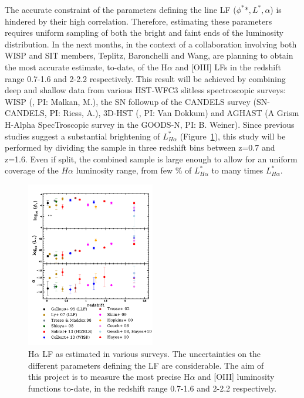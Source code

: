 The accurate constraint of the parameters defining the line LF ($\phi^{*}*, L^{*}, \alpha$) is hindered by their high correlation. Therefore, estimating these parameters requires uniform sampling of both the bright and faint ends of the luminosity distribution. In the next months, in the context of a collaboration involving both WISP and SIT members, Teplitz, Baronchelli and Wang, are planning to obtain the most accurate estimate, to-date, of the H$\alpha$ and [OIII] LFs in the redshift range 0.7-1.6 and 2-2.2 respectively. This result will be achieved by combining deep and shallow data from various HST-WFC3 slitless spectroscopic surveys: WISP (\citet{Atek:2010}, PI: Malkan, M.), the SN followup of the CANDELS survey (SN-CANDELS, PI: Riess, A.), 3D-HST (\citet{VanDokkum:2011,Brammer:2012}, PI: Van Dokkum) and AGHAST (A Grism H-Alpha SpecTroscopic survey in the GOODS-N, PI: B. Weiner).
Since previous studies suggest a substantial brightening of $L^{*}_{H\alpha}$ (Figure~\ref{fig:img_depths}), this study will be performed by dividing the sample in three redshift bins between z=0.7 and z=1.6. Even if split, the combined sample is large enough to allow for an uniform coverage of the $H\alpha$ luminosity range, from few \% of $L^{*}_{H\alpha}$ to many times $L^{*}_{H\alpha}$.

\begin{figure}[!t]
\includegraphics[width=0.5\textwidth]{Plots/HA_LF.pdf}
\caption{H$\alpha$ LF as estimated in various surveys. The uncertainties on the different parameters defining the LF are considerable. The aim of this project is to measure the most precise H$\alpha$ and [OIII] luminosity functions to-date, in the redshift range 0.7-1.6 and 2-2.2 respectively.}%
\label{fig:img_depths}
\end{figure}

